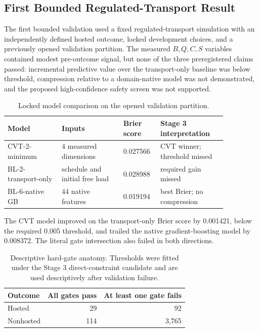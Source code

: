 \documentclass[11pt]{article}
\begin{document}
\subsection{First Bounded Regulated-Transport Result}

The first bounded validation used a fixed regulated-transport simulation with an independently defined hosted outcome, locked development choices, and a previously opened validation partition. The measured \(B,Q,C,S\) variables contained modest pre-outcome signal, but none of the three preregistered claims passed: incremental predictive value over the transport-only baseline was below threshold, compression relative to a domain-native model was not demonstrated, and the proposed high-confidence safety screen was not supported.

\begin{table}[htbp]
\centering
\small
\caption{Locked model comparison on the opened validation partition.}
\label{tab:locked-model-comparison}
\begin{tabular}{p{0.22\linewidth}p{0.25\linewidth}p{0.12\linewidth}p{0.27\linewidth}}
\toprule
Model & Inputs & Brier score & Stage 3 interpretation \\
\midrule
CVT-2-minimum & 4 measured dimensions & 0.027566 & CVT winner; threshold missed \\
BL-2-transport-only & schedule and initial free load & 0.028988 & required gain missed \\
BL-6-native GB & 44 native features & 0.019194 & best Brier; no compression \\
\bottomrule
\end{tabular}
\end{table}

The CVT model improved on the transport-only Brier score by 0.001421, below the required 0.005 threshold, and trailed the native gradient-boosting model by 0.008372. The literal gate intersection also failed in both directions.

\begin{table}[htbp]
\centering
\small
\caption{Descriptive hard-gate anatomy. Thresholds were fitted under the Stage 3 direct-constraint candidate and are used descriptively after validation failure.}
\label{tab:hard-gate-anatomy}
\begin{tabular}{lrr}
\toprule
Outcome & All gates pass & At least one gate fails \\
\midrule
Hosted & 29 & 92 \\
Nonhosted & 114 & 3,765 \\
\bottomrule
\end{tabular}
\end{table}
\end{document}
